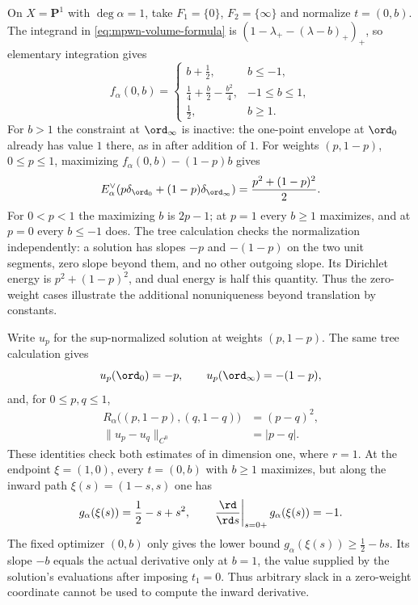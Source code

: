 \begin{example}
\label{ex:mpwn-two-point-constraints}
On $X=\mathbf P^1$ with $\deg\alpha=1$, take $F_1=\{0\}$,
$F_2=\{\infty\}$ and normalize $t=(0,b)$.
The integrand in \eqref{eq:mpwn-volume-formula} is
$(1-\lambda_+-(\lambda-b)_+)_+$, so elementary integration gives
\[
 f_\alpha(0,b)=
 \begin{cases}
 b+\frac12,& b\leq-1,\\
 \frac14+\frac b2-\frac{b^2}{4},& -1\leq b\leq1,\\
 \frac12,& b\geq1.
 \end{cases}
\]
For $b>1$ the constraint at $\ord_\infty$ is inactive:
the one-point envelope at $\ord_0$ already has value $1$ there,
as in  after addition of $1$.
For weights $(p,1-p)$, $0\leq p\leq1$, maximizing
$f_\alpha(0,b)-(1-p)b$ gives
\[
 E_\alpha^\vee(p\delta_{\ord_0}+(1-p)\delta_{\ord_\infty})
                        =\frac{p^2+(1-p)^2}{2}.
\]
For $0<p<1$ the maximizing $b$ is $2p-1$; at $p=1$ every
$b\geq1$ maximizes, and at $p=0$ every $b\leq-1$ does.
The tree calculation checks the normalization independently:
a solution has slopes $-p$ and $-(1-p)$ on the two unit segments,
zero slope beyond them, and no other outgoing slope.
Its Dirichlet energy is $p^2+(1-p)^2$, and dual energy is half
this quantity.  Thus the zero-weight cases illustrate the
additional nonuniqueness beyond translation by constants.

Write $u_p$ for the sup-normalized solution at weights $(p,1-p)$. The same tree calculation gives
\[
 u_p(\ord_0)=-p,\qquad u_p(\ord_\infty)=-(1-p),
\]
and, for $0\leq p,q\leq1$,
\[
 \begin{aligned}
 R_\alpha\bigl((p,1-p),(q,1-q)\bigr)&=(p-q)^2,\\
 \|u_p-u_q\|_{C^0}&=|p-q|.
 \end{aligned}
\]
These identities check both estimates of  in dimension one, where $r=1$.
At the endpoint $\xi=(1,0)$, every $t=(0,b)$ with $b\geq1$ maximizes, but along the inward path $\xi(s)=(1-s,s)$ one has
\[
 g_\alpha(\xi(s))=\frac12-s+s^2,
 \qquad
 \left.\frac{\rd}{\rd s}\right|_{s=0+}g_\alpha(\xi(s))=-1.
\]
The fixed optimizer $(0,b)$ only gives the lower bound $g_\alpha(\xi(s))\geq\frac12-bs$. Its slope $-b$ equals the actual derivative only at $b=1$, the value supplied by the solution's evaluations after imposing $t_1=0$. Thus arbitrary slack in a zero-weight coordinate cannot be used to compute the inward derivative.


\end{example}
